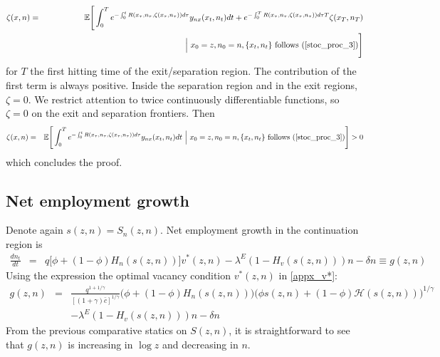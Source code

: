 \begin{eqnarray*}
\zeta(x,n) &=& \mathbb{E} \Bigg[ \int_0^T e^{- \int_0^t
R(x_\tau,n_\tau,\zeta(x_\tau,n_\tau)) d\tau} y_{nx}(x_t,n_t) dt +
e^{-\int_0^T R(x_\tau,n_\tau,\zeta(x_\tau,n_\tau)) d\tau T} \zeta(x_T,n_T) \\
&& \hskip6cm \Big| \ x_0 = z , n_0 = n , \{x_t,n_t\} \text{ follows (\ref%
{stoc_proc_3})} \Bigg]
\end{eqnarray*}
for $T$ the first hitting time of the exit/separation region. The
contribution of the first term is always positive. Inside the separation
region and in the exit regions, $\zeta = 0$. We restrict attention to twice
continuously differentiable functions, so $\zeta = 0$ on the exit and
separation frontiers. Then
\begin{eqnarray*}
\zeta(x,n) &=& \mathbb{E} \Bigg[ \int_0^T e^{- \int_0^t
R(x_\tau,n_\tau,\zeta(x_\tau,n_\tau)) d\tau} y_{nx}(x_t,n_t) dt \ \Big| \
x_0 = z , n_0 = n , \{x_t,n_t\} \text{ follows (\ref{stoc_proc_3})} \Bigg]>0
\end{eqnarray*}
which concludes the proof.

\subsection{Net employment growth}
Denote again $s(z,n)=S_n(z,n)$. Net employment growth in the continuation region is
\begin{eqnarray*}
\frac{dn_t}{dt} &=& q \Big[ \phi + (1-\phi) H_n(s(z,n)) \Big] v^*(z,n) -
\lambda^E (1- H_v(s(z,n))) n - \delta n \equiv g(z,n)
\end{eqnarray*}
Using the expression the optimal vacancy condition $v^*(z,n)$ in \eqref{appx_v*}:
\begin{eqnarray*}
g(z,n) &=& \frac{q^{1+1/\gamma}}{[(1+\gamma) \bar{c}]^{1/\gamma}} \Big( \phi +
(1-\phi) H_n(s(z,n)) \Big) \Big( \phi s(z,n) + (1-\phi) \mathcal{H}%
(s(z,n)) \Big)^{1/\gamma} \\
&& - \lambda^E (1- H_v(s(z,n))) n - \delta n
\end{eqnarray*}
From the previous comparative statics on $S(z,n)$, it is straightforward
to see that $g(z,n)$ is increasing in $\log z$ and decreasing in $n$.

